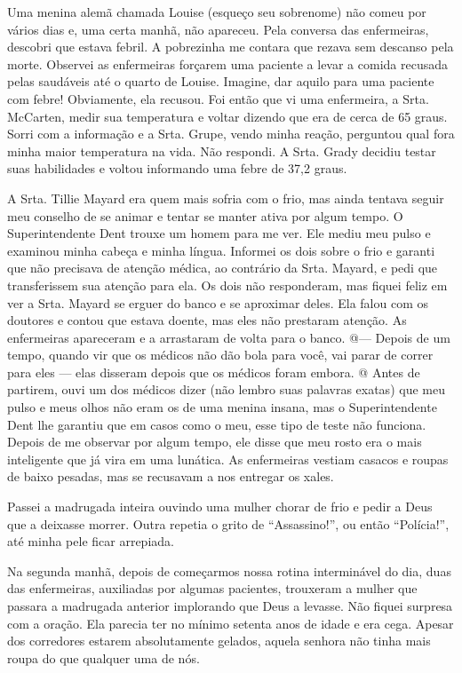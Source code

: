 Uma menina alemã chamada Louise (esqueço seu sobrenome) não comeu por
vários dias e, uma certa manhã, não apareceu. Pela conversa das
enfermeiras, descobri que estava febril. A pobrezinha me contara que
rezava sem descanso pela morte. Observei as enfermeiras forçarem uma
paciente a levar a comida recusada pelas saudáveis até o quarto de
Louise. Imagine, dar aquilo para uma paciente com febre! Obviamente, ela
recusou. Foi então que vi uma enfermeira, a Srta. McCarten, medir sua
temperatura e voltar dizendo que era de cerca de 65 graus. Sorri com a
informação e a Srta. Grupe, vendo minha reação, perguntou qual fora
minha maior temperatura na vida. Não respondi. A Srta. Grady decidiu
testar suas habilidades e voltou informando uma febre de 37,2 graus.

A Srta. Tillie Mayard era quem mais sofria com o frio, mas ainda tentava
seguir meu conselho de se animar e tentar se manter ativa por algum
tempo. O Superintendente Dent trouxe um homem para me ver. Ele mediu meu
pulso e examinou minha cabeça e minha língua. Informei os dois sobre o
frio e garanti que não precisava de atenção médica, ao contrário da
Srta. Mayard, e pedi que transferissem sua atenção para ela. Os dois não
responderam, mas fiquei feliz em ver a Srta. Mayard se erguer do banco e
se aproximar deles. Ela falou com os doutores e contou que estava
doente, mas eles não prestaram atenção. As enfermeiras apareceram e a
arrastaram de volta para o banco. @--- Depois de um tempo, quando vir
que os médicos não dão bola para você, vai parar de correr para eles ---
elas disseram depois que os médicos foram embora. @ Antes de partirem,
ouvi um dos médicos dizer (não lembro suas palavras exatas) que meu
pulso e meus olhos não eram os de uma menina insana, mas o
Superintendente Dent lhe garantiu que em casos como o meu, esse tipo de
teste não funciona. Depois de me observar por algum tempo, ele disse que
meu rosto era o mais inteligente que já vira em uma lunática. As
enfermeiras vestiam casacos e roupas de baixo pesadas, mas se recusavam
a nos entregar os xales.

Passei a madrugada inteira ouvindo uma mulher chorar de frio e pedir a
Deus que a deixasse morrer. Outra repetia o grito de ``Assassino!'', ou
então ``Polícia!'', até minha pele ficar arrepiada.

Na segunda manhã, depois de começarmos nossa rotina interminável do dia,
duas das enfermeiras, auxiliadas por algumas pacientes, trouxeram a
mulher que passara a madrugada anterior implorando que Deus a levasse.
Não fiquei surpresa com a oração. Ela parecia ter no mínimo setenta anos
de idade e era cega. Apesar dos corredores estarem absolutamente
gelados, aquela senhora não tinha mais roupa do que qualquer uma de nós.

